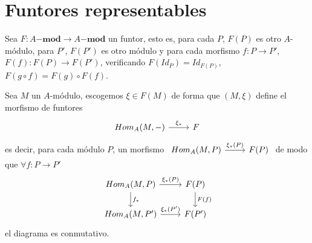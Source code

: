 \section{Funtores representables}
Sea $F:A\mathbf{-mod} \longrightarrow A\mathbf{-mod}$ un funtor, esto es, para cada $P$, $F(P)$ es otro $A$-m\'odulo, para $P'$, $F(P')$ es otro m\'odulo y para cada morfismo $f: P \longrightarrow P'$, $F(f): F(P)\longrightarrow F(P')$, verificando $F(Id_P) = Id_{F(P)}$, $F(g\circ f) = F(g) \circ F(f)$. 

Sea $M$ un $A$-m\'odulo, escogemos $\xi \in F(M)$ de forma que $(M, \xi)$ define el morfismo de funtores 
$$\bt Hom_A(M, -) \arrow{r}{\xi_*} & F \et$$
es decir, para cada m\'odulo $P$, un morfismo $\bt Hom_A(M, P) \arrow{r}{\xi_*(P)} & F(P) \et$
de modo que $\forall f: P \longrightarrow P'$
$$\bt Hom_A(M, P) \arrow{r}{\xi_*(P)} \arrow{d}{f_*} & F(P) \arrow{d}{F(f)} \\ Hom_A(M, P') \arrow{r}{\xi_*(P')}  & F(P') \et$$
el diagrama es conmutativo.

